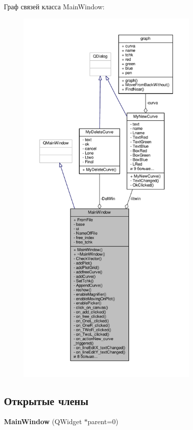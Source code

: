 Граф связей класса Main\+Window\+:\nopagebreak
\begin{figure}[H]
\begin{center}
\leavevmode
\includegraphics[height=550pt]{class_main_window__coll__graph}
\end{center}
\end{figure}
\subsection*{Открытые члены}
\begin{DoxyCompactItemize}
\item 
{\bfseries Main\+Window} (Q\+Widget $\ast$parent=0)\hypertarget{class_main_window_a8b244be8b7b7db1b08de2a2acb9409db}{}\label{class_main_window_a8b244be8b7b7db1b08de2a2acb9409db}

\end{DoxyCompactItemize}
